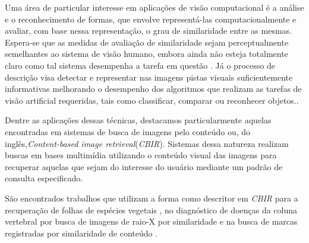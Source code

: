 
Uma área de particular interesse em aplicações de visão computacional é a análise e o reconhecimento de formas, que envolve representá-las computacionalmente e avaliar, com base nessa representação, o grau de similaridade entre as mesmas. Espera-se que as medidas de avaliação de similaridade sejam perceptualmente semelhantes ao sistema de visão humano, embora ainda não esteja totalmente claro como tal sistema desempenha a tarefa em questão \cite{4815272}. Já o processo de descrição visa detectar e representar nas imagens pistas visuais suficientemente informativas melhorando o desempenho dos algoritmos que realizam as tarefas de visão artificial requeridas, tais como classificar, comparar ou reconhecer objetos.\cite{Escolano:2009}.



Dentre as aplicações dessas técnicas, destacamos particularmente aquelas encontradas em sistemas de busca de imagens pelo conteúdo ou, do inglês,\foreignlanguage{english}{\emph{Content-based image retrieval}}(\emph{CBIR}). Sistemas dessa natureza realizam buscas em bases multimídia utilizando o conteúdo visual das imagens para recuperar aquelas que sejam do interesse do usuário mediante um padrão de consulta especificado. 

São encontrados trabalhos que utilizam a forma como descritor em \emph{CBIR} para a recuperação de folhas de espécies vegetais \cite{Fotopoulou:2013, Nam2008245, Wang:2000}, no diagnóstico de doenças da coluna vertebral por busca de imagens de raio-X por similaridade \cite{Lee:2009} e na busca de marcas registradas por similaridade de conteúdo \cite{MohdAnuar2013105,Qi20102017}.

